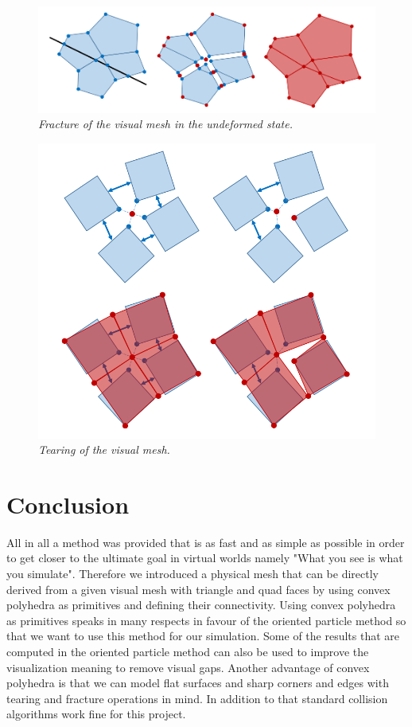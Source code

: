 \documentclass[
	11pt, 
	DIV10,
	a4paper, 
	oneside, 
	headings=normal, 
	captions=tableheading,
	final, 
	numbers=noenddot
]{scrartcl}
\begin{document}
	\begin{figure}[H]
		\centering
		\includegraphics[scale = 0.4]{Fracture.PNG}
		\caption[caption]{\label{Fracture} \textit{Fracture of the visual mesh in the undeformed state.} \footnotemark[1]}
	\end{figure}

	\begin{figure}[H]
		\centering
		\includegraphics[scale = 0.38]{Tearing.PNG}
		\caption[caption]{\label{Tearing} \textit{Tearing of the visual mesh.} \footnotemark[1]}
	\end{figure}
\section{Conclusion}
	All in all a method was provided that is as fast and as simple as possible in order to get closer to the ultimate goal in virtual worlds namely "What you see is what you simulate". Therefore we introduced a physical mesh that can be directly derived from a given visual mesh with triangle and quad faces by using convex polyhedra as primitives and defining their connectivity. Using convex polyhedra as primitives speaks in many respects in favour of the oriented particle method so that we want to use this method for our simulation. Some of the results that are computed in the oriented particle method can also be used to improve the visualization meaning to remove visual gaps. Another advantage of convex polyhedra is that we can model flat surfaces and sharp corners and edges with tearing and fracture operations in mind. In addition to that standard collision algorithms work fine for this project.
	
\end{document}
